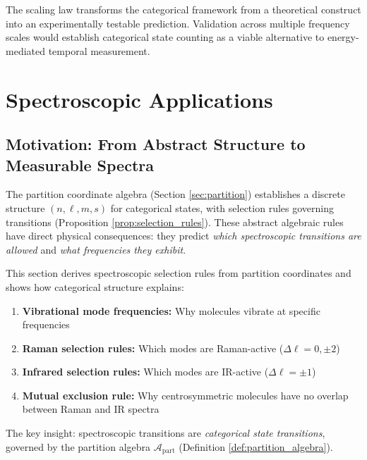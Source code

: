 \documentclass[twocolumn,10pt]{article}
\theoremstyle{remark}
\begin{document}
The scaling law transforms the categorical framework from a theoretical construct into an experimentally testable prediction. Validation across multiple frequency scales would establish categorical state counting as a viable alternative to energy-mediated temporal measurement.

\section{Spectroscopic Applications}
\label{sec:spectroscopy}

\subsection{Motivation: From Abstract Structure to Measurable Spectra}

The partition coordinate algebra (Section \ref{sec:partition}) establishes a discrete structure $(n, \ell, m, s)$ for categorical states, with selection rules governing transitions (Proposition \ref{prop:selection_rules}). These abstract algebraic rules have direct physical consequences: they predict \textit{which spectroscopic transitions are allowed} and \textit{what frequencies they exhibit}.

This section derives spectroscopic selection rules from partition coordinates and shows how categorical structure explains:
\begin{enumerate}
    \item \textbf{Vibrational mode frequencies:} Why molecules vibrate at specific frequencies
    \item \textbf{Raman selection rules:} Which modes are Raman-active ($\Delta \ell = 0, \pm 2$)
    \item \textbf{Infrared selection rules:} Which modes are IR-active ($\Delta \ell = \pm 1$)
    \item \textbf{Mutual exclusion rule:} Why centrosymmetric molecules have no overlap between Raman and IR spectra
\end{enumerate}

The key insight: spectroscopic transitions are \textit{categorical state transitions}, governed by the partition algebra $\mathcal{A}_{\text{part}}$ (Definition \ref{def:partition_algebra}).
\end{document}
